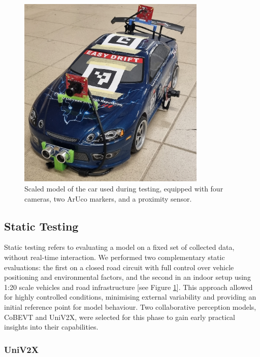 \begin{figure}[tph]
    \centering
    \includegraphics[width=0.8\textwidth]{figures/introduction/scale_car}
    \caption{Scaled model of the car used during testing, equipped with four cameras, two ArUco markers, and a proximity sensor.}
    \label{scale-car}
\end{figure}

\subsection{Static Testing}

Static testing refers to evaluating a model on a fixed set of collected data, without real-time interaction.
We performed two complementary static evaluations: the first on a closed road circuit with full control over vehicle positioning and environmental factors, and the second in an indoor setup using 1:20 scale vehicles and road infrastructure [see Figure \ref{scale-car}].
This approach allowed for highly controlled conditions, minimising external variability and providing an initial reference point for model behaviour.
Two collaborative perception models, CoBEVT\cite{xu2022cobevtcooperativebirdseye} and UniV2X\cite{yu2024_univ2x}, were selected for this phase to gain early practical insights into their capabilities.

\subsubsection{UniV2X}

